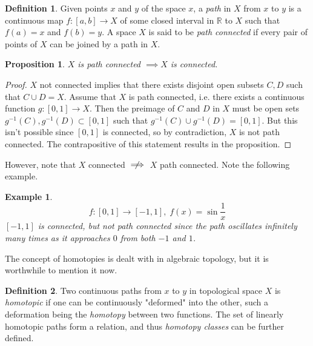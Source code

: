 \documentclass{article}
\newtheorem{proposition}[theorem]{Proposition}
\newtheorem{example}{Example}[section]
\theoremstyle{remark}
\theoremstyle{definition}
\newtheorem{definition}{Definition}[section]
\begin{document}
\begin{definition}
Given points $x$ and $y$ of the space $x$, a \textit{path} in $X$ from $x$ to $y$ is a continuous map $f: [a,b] \longrightarrow X$ of some closed interval in $\mathbb{R}$ to $X$ such that $f(a) = x$ and $f(b)=y$. A space $X$ is said to be \textit{path connected} if every pair of points of $X$ can be joined by a path in $X$. 
\end{definition}

\begin{proposition}
$X$ is path connected $\implies X$ is connected. 
\end{proposition}
\begin{proof}
$X$ not connected implies that there exists disjoint open subsets $C, D$ such that $C \cup D = X$. Assume that $X$ is path connected, i.e. there exists a continuous function $g: [0,1] \longrightarrow X$. Then the preimage of $C$ and $D$ in $X$ must be open sets $g^{-1} (C), g^{-1} (D) \subset [0,1]$ such that $g^{-1}(C) \cup g^{-1}(D) = [0,1]$. But this isn't possible since $[0,1]$ is connected, so by contradiction, $X$ is not path connected. The contrapositive of this statement results in the proposition. 
\end{proof}

\begin{center}
\end{center}

However, note that $X$ connected $\centernot\implies$ $X$ path connected. Note the following example. 

\begin{example}
\[ f:[0,1] \longrightarrow [-1,1], \; f(x) = \sin{\frac{1}{x}}\]
$[-1,1]$ is connected, but not path connected since the path oscillates infinitely many times as it approaches $0$ from both $-1$ and $1$. 
\end{example}

The concept of homotopies is dealt with in algebraic topology, but it is worthwhile to mention it now. 

\begin{definition}
Two continuous paths from $x$ to $y$ in topological space $X$ is \textit{homotopic} if one can be continuously "deformed" into the other, such a deformation being the \textit{homotopy} between two functions. The set of linearly homotopic paths form a relation, and thus \textit{homotopy classes} can be further defined. 
\end{definition}
\end{document}
